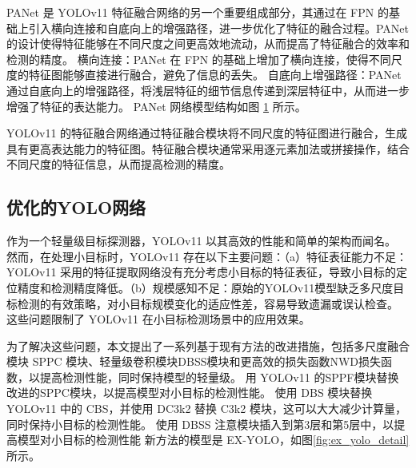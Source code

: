 PANet 是 YOLOv11 特征融合网络的另一个重要组成部分\cite{pan}，其通过在 FPN 的基础上引入横向连接和自底向上的增强路径，进一步优化了特征的融合过程。PANet 的设计使得特征能够在不同尺度之间更高效地流动，从而提高了特征融合的效率和检测的精度。
横向连接：PANet 在 FPN 的基础上增加了横向连接，使得不同尺度的特征图能够直接进行融合，避免了信息的丢失。
自底向上增强路径：PANet 通过自底向上的增强路径，将浅层特征的细节信息传递到深层特征中，从而进一步增强了特征的表达能力。
PANet 网络模型结构如图 \ref{fig:panet} 所示。
\begin{figure}[htb]
    \centering
    \captionsetup{font=footnotesize}
    \label{fig:panet}
\end{figure}

YOLOv11 的特征融合网络通过特征融合模块将不同尺度的特征图进行融合，生成具有更高表达能力的特征图。特征融合模块通常采用逐元素加法或拼接操作，结合不同尺度的特征信息，从而提高检测的精度。

\subsection{优化的YOLO网络}

作为一个轻量级目标探测器，YOLOv11 以其高效的性能和简单的架构而闻名。 然而，在处理小目标时，YOLOv11 存在以下主要问题：（a）特征表征能力不足：YOLOv11 采用的特征提取网络没有充分考虑小目标的特征表征，导致小目标的定位精度和检测精度降低。（b）规模感知不足：原始的YOLOv11模型缺乏多尺度目标检测的有效策略，对小目标规模变化的适应性差，容易导致遗漏或误认检查。 这些问题限制了 YOLOv11 在小目标检测场景中的应用效果。 

为了解决这些问题，本文提出了一系列基于现有方法的改进措施，包括多尺度融合模块 SPPC 模块、轻量级卷积模块DBSS模块和更高效的损失函数NWD损失函数，以提高检测性能，同时保持模型的轻量级。
用 YOLOv11 的SPPF模块替换改进的SPPC模块，以提高模型对小目标的检测性能。
使用 DBS 模块替换 YOLOv11 中的 CBS，并使用 DC3k2 替换 C3k2 模块，这可以大大减少计算量，同时保持小目标的检测性能。
使用 DBSS 注意模块插入到第3层和第5层中，以提高模型对小目标的检测性能 
新方法的模型是 EX-YOLO，如图\ref{fig:ex_yolo_detail}所示。

